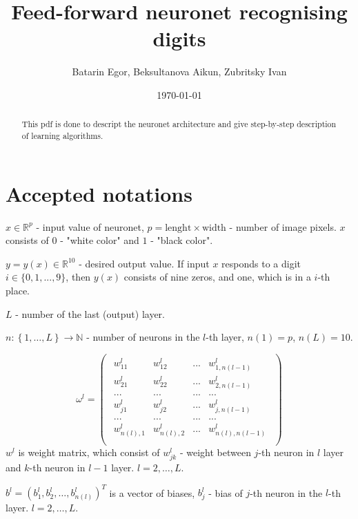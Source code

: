 \documentclass[a4paper,12pt]{article}
\author{Batarin Egor, Beksultanova Aikun, Zubritsky Ivan}
\title{Feed-forward neuronet recognising digits}
\date{\today}
\theoremstyle{plain} %
\theoremstyle{definition} %
\theoremstyle{remark} %
\begin{document}
 
\maketitle
 
\begin{abstract}
   This pdf is done to descript the neuronet architecture and give step-by-step description of learning algorithms.
\end{abstract}
\section{Accepted notations}

$x \in \mathbb {R}^p$ - input value of neuronet, $p = \text{lenght} \times \text{width}$ - number of image pixels. $x$ consists of $0$ - "white color" and $1$ - "black color".

$y = y(x) \in \mathbb {R}^{10}$ - desired output value. If input $x$ responds to a digit $i \in \{0, 1, ... , 9\}$, then $y(x)$ consists of nine zeros, and one, which is in a $i$-th place.

$L$ - number of the last (output) layer.

$n:\left\{ {1, \ldots ,L} \right\} \to \mathbb {N}$ - number of neurons in the $l$-th layer, $n(1) = p$, $n(L) = 10$.


\[{\omega ^l} = \left( \begin{array}{l}
\begin{array}{*{20}{c}}
{w_{11}^l} & {w_{12}^l} & ... & {w_{1,n(l-1)}^l} \\
{w_{21}^l} & {w_{22}^l} & ... & {w_{2,n(l-1)}^l} \\
...     &     ...    & ... & ... \\
{w_{j1}^l} & {w_{j2}^l} & ... & {w_{j,n(l-1)}^l}\\
...     &     ...    & ... & ... \\
{w_{n(l),1}^l} & {w_{n(l),2}^l} & ... & {w_{n(l),n(l-1)}^l} 
\end{array}\\

\end{array} \right)\]
$w^l$ is weight matrix, which consist of $w_{jk}^l$ - weight between $j$-th neuron in $l$ layer and $k$-th
neuron in $l-1$ layer. $l = 2, \ldots, L$.


${b^l} = {\left( {b_1^l,b_2^l, \ldots, b_{n(l)}^l} \right)^T}$ is a vector of biases, ${b_j^l}$ - bias of $j$-th neuron in the $l$-th layer. $l = 2, \ldots, L$.
\end{document}
